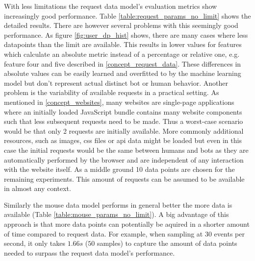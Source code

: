 \documentclass[
    fontsize=12pt,
    headings=small,
    parskip=half,           %
    bibliography=totoc,
    numbers=noenddot,       %
    open=any,               %
    final,                   %
    table
]{scrreprt}
\begin{document}
With less limitations the request data model's evaluation metrics show increasingly good performance. Table \ref{table:request_params_no_limit} shows the detailed results. There are however several problems with this seemingly good performance. As figure \ref{fig:user_dp_hist} shows, there are many cases where less datapoints than the limit are available. This results in lower values for features which calculate an absolute metric instead of a percentage or relative one, e.g. feature four and five described in \ref{concept_request_data}. These differences in absolute values can be easily learned and overfitted to by the machine learning model but don't represent actual distinct bot or human behavior.
Another problem is the variability of available requests in a practical setting. As mentioned in \ref{concept_websites}, many websites are single-page applications where an initially loaded JavaScript bundle contains many website components such that less subsequent requests need to be made. Thus a worst-case scenario would be that only 2 requests are initially available. More commonly additional resources, such as images, css files or api data might be loaded but even in this case the initial requests would be the same between humans and bots as they are automatically performed by the browser and are independent of any interaction with the website itself. As a middle ground 10 data points are chosen for the remaining experiments. This amount of requests can be assumed to be available in almost any context.

Similarly the mouse data model performs in general better the more data is available (Table \ref{table:mouse_params_no_limit}). A big advantage of this approach is that more data points can potentially be aquired in a shorter amount of time compared to request data. For example, when sampling at $30$ events per second, it only takes $1.66s$ ($50$ samples) to capture the amount of data points needed to surpass the request data model's performance.
\end{document}
